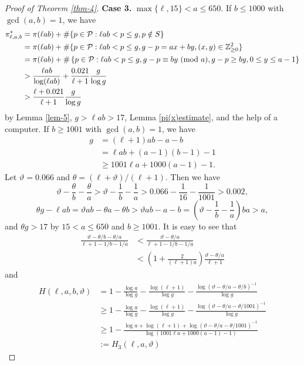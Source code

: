 \documentclass[12pt,a4paper,reqno]{amsart}
\numberwithin{equation}{section}
\def\Z{{\mathbb Z}}
\def\pmod #1{\ ({\rm{mod}}\ #1)}
\def\cP{{\mathcal P}}
\theoremstyle{plain}
\theoremstyle{definition}
\begin{document}
\begin{proof}[Proof of Theorem \ref{thm-4}]
\textbf{Case 3.} $\max\{\ell,15\}<a\leq 650$. If $b\leq 1000$ with $\gcd(a,b)=1$, we have
\begin{align*}
	\pi^{*}_{\ell,a,b}
	&=\pi(\ell ab)+\#\{p\in\cP: \ell ab<p\leq g,p\notin S\}\\
	&= \pi(\ell ab)+\#\{p\in\cP:\ell ab<p\leq g, g-p =ax+by,(x,y)\in\Z_{\geq 0}^{2}\}\\
	&= \pi(\ell ab)+\#\left\{ p\in\cP: \ell ab<p\leq g,g-p \equiv by \pmod{a}, g-p\geq by,0\leq y\leq a-1 \right\}\\
	&>\frac{\ell ab}{\log (\ell ab)}+\frac{0.021}{\ell+1}\frac{g}{\log g}\\
	&>\frac{\ell+0.021}{\ell+1}\frac{g}{\log g}
\end{align*}
by Lemma \ref{lem-5}, $g>\ell a b>17$, Lemma \ref{pi(x)estimate}, and the help of a computer.
 If $b\geq 1001$ with $\gcd(a,b)=1$, we have
 \begin{align*}
 	g&=(\ell+1)ab-a-b\\
 	&=\ell ab+(a-1)(b-1)-1\\
 	&\geq 1001 \ell a+1000(a-1)-1.
 \end{align*}
 Let $\vartheta= 0.066$ and $\theta=(\ell+\vartheta)/(\ell+1)$. Then we have 
  $$
 \vartheta -\frac{\theta}{b} -\frac{\theta}{a}
 >\vartheta-\frac{1}{b}-\frac{1}{a}
 >0.066-\frac{1}{16}-\frac{1}{1001}>0.002,
 $$
 $$\theta g-\ell ab
 =\vartheta ab-\theta a-\theta b
 >\vartheta ab-a-b
 =\left( \vartheta-\frac{1}{b}-\frac{1}{a} \right) ba
 >a,
 $$
 and 
 $\theta g>17$ by $15<a\leq 650$ and $b\geq 1001$. 
 It is easy to see that
 \begin{align}
 	\frac{\vartheta-\theta/b-\theta/a}{\ell+1-1/b-1/a}
 	&< \frac{\vartheta-\theta/a}{\ell+1-1/b-1/a}\nonumber\\
 	&< \left( 1+\frac{2}{(\ell+1)a} \right) \frac{\vartheta-\theta/a}{\ell+1}\label{thm-4-C3-ineq-1}
 \end{align}
 and
 \begin{align}
 H(\ell,a,b,\vartheta)
 	&= 1-\frac{\log a}{\log  g}-\frac{\log(\ell+1)}{\log g}-\frac{\log( \vartheta-\theta/a-\theta/b)^{-1}}{\log  g}\nonumber\\
 	&\geq 1-\frac{\log a}{\log g}-\frac{\log (\ell+1)}{\log g}-\frac{\log(\vartheta-\theta/a-\theta/1001)^{-1}}{\log g}\nonumber\\
 	&\geq 1-\frac{\log a+ \log(\ell+1)+\log(\vartheta-\theta/a-\theta/1001)^{-1}}{\log \left(1001 \ell a+1000(a-1)-1\right)}\nonumber\\
 	&:=H_{3}(\ell,a,\vartheta)\label{thm-4-C3-ineq-2}
 \end{align}

\end{proof}
\end{document}
